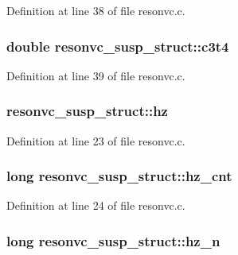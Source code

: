 Definition at line 38 of file resonvc.\+c.

\subsubsection[{\texorpdfstring{c3t4}{c3t4}}]{\setlength{\rightskip}{0pt plus 5cm}double resonvc\+\_\+susp\+\_\+struct\+::c3t4}\hypertarget{structresonvc__susp__struct_a8b98aea8005417346ce62f3f192b68e3}{}\label{structresonvc__susp__struct_a8b98aea8005417346ce62f3f192b68e3}


Definition at line 39 of file resonvc.\+c.

\subsubsection[{\texorpdfstring{hz}{hz}}]{ resonvc\+\_\+susp\+\_\+struct\+::hz}\hypertarget{structresonvc__susp__struct_a4cefb3eeee81e5337c9255c9eabaa937}{}\label{structresonvc__susp__struct_a4cefb3eeee81e5337c9255c9eabaa937}


Definition at line 23 of file resonvc.\+c.

\subsubsection[{\texorpdfstring{hz\+\_\+cnt}{hz_cnt}}]{\setlength{\rightskip}{0pt plus 5cm}long resonvc\+\_\+susp\+\_\+struct\+::hz\+\_\+cnt}\hypertarget{structresonvc__susp__struct_ad650a7d92ab80fc1bb444d30411cefb1}{}\label{structresonvc__susp__struct_ad650a7d92ab80fc1bb444d30411cefb1}


Definition at line 24 of file resonvc.\+c.

\subsubsection[{\texorpdfstring{hz\+\_\+n}{hz_n}}]{\setlength{\rightskip}{0pt plus 5cm}long resonvc\+\_\+susp\+\_\+struct\+::hz\+\_\+n}\hypertarget{structresonvc__susp__struct_afcb4b558f2710e57d1baf5d20d91744b}{}\label{structresonvc__susp__struct_afcb4b558f2710e57d1baf5d20d91744b}


